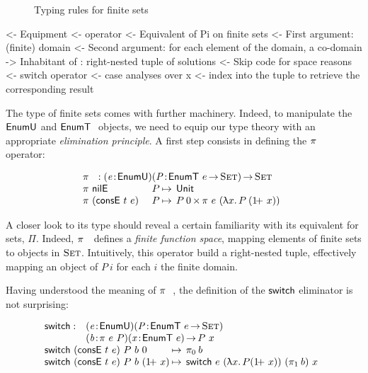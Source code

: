 \begin{figure}



\caption{Typing rules for finite sets}
\label{fig:typing-finite-set}

\end{figure}


\begin{wstructure}
<- Equipment
    <- \spi operator
        <- Equivalent of Pi on finite sets
        <- First argument: (finite) domain
        <- Second argument: for each element of the domain, a co-domain
        -> Inhabitant of \spi: right-nested tuple of solutions
            <- Skip code for space reasons
    <- switch operator
        <- case analyses over x
        <- index into the \spi tuple to retrieve the corresponding result
\end{wstructure}

The type of finite sets comes with further machinery. Indeed, to
manipulate the $\EnumU$ and $\EnumT{}$ objects, we need to equip our
type theory with an appropriate \emph{elimination principle}. A first
step consists in defining the $\spi{}{}$ operator:

\[\stk{
\spi{}{} : \PITEL{\V{e}}{\EnumU}
           \PITEL{\V{P}}{\EnumT{e} \To \Set} \To \Set \\
\begin{array}{@{}ll@{\:\mapsto\:\:}l}
\spi{\NilE}{& P}        & \Unit \\
\spi{(\ConsE{t}{e})}{& P} & \TIMES{P\: \Ze}{\spi{e}{(\LAM{x} P\: (\Su{x}))}}
\end{array}
}\]


A closer look to its type should reveal a certain familiarity with its
equivalent for sets, $\Pi$. Indeed, $\spi{}{}$ defines a \emph{finite
  function space}, mapping elements of finite sets to objects in
$\Set$. Intuitively, this operator build a right-nested tuple,
effectively mapping an object of $P\:i$ for each $i$ the finite
domain.

Having understood the meaning of $\spi{}{}$, the definition of the
$\F{switch}$ eliminator is not surprising:

\[\stk{
\begin{array}{@{}ll}
\F{switch} : & \PITEL{\V{e}}{\EnumU}
               \PITEL{\V{P}}{\EnumT{e} \To \Set} \\
             & \PITEL{\V{b}}{\spi{e}{P}}
               \PITEL{\V{x}}{\EnumT{e}} \To P~x
\end{array} \\
\begin{array}{@{}l@{\:\mapsto\:\:}l}
\switch{(\ConsE{t}{e})}{P}{b}{\Ze}      & \fst{b} \\
\switch{(\ConsE{t}{e})}{P}{b}{(\Su{x})} & \switch{e}{(\LAM{x} P
  (\Su{x}))}{(\snd{b})}{x}
\end{array}
}\]

